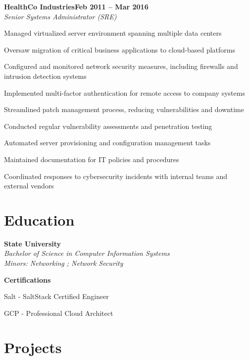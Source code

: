 \documentclass[letterpaper,10pt]{article}
\newcommand{\heading}[2]{
  \hspace{10pt}#1\hfill#2\\
}
\newcommand{\headingBf}[2]{
  \heading{\textbf{#1}}{\textbf{#2}}
}
\newcommand{\headingIt}[2]{
  \heading{\textit{#1}}{\textit{#2}}
}
\newenvironment{resume_list}{
  \vspace{-5pt}
  \begin{itemize}[itemsep=0px, parsep=2pt, leftmargin=30pt]
}{
  \end{itemize}
  \vspace{-2pt}
}
\begin{document}
  \headingBf{HealthCo Industries}{Feb 2011 -- Mar 2016}
  \headingIt{Senior Systems Administrator (SRE)}{}
  \begin{resume_list}
    \item Managed virtualized server environment spanning multiple data centers
    \item Oversaw migration of critical business applications to cloud-based platforms
    \item Configured and monitored network security measures, including firewalls and intrusion detection systems
    \item Implemented multi-factor authentication for remote access to company systems
    \item Streamlined patch management process, reducing vulnerabilities and downtime
    \item Conducted regular vulnerability assessments and penetration testing
    \item Automated server provisioning and configuration management tasks
    \item Maintained documentation for IT policies and procedures
    \item Coordinated responses to cybersecurity incidents with internal teams and external vendors
  \end{resume_list}


  \section{Education}

  \headingBf{State University}{} %
  \headingIt{Bachelor of Science in Computer Information Systems}{}
  \headingIt{Minors: Networking ; Network Security}{}

  \vspace{5pt}
  \headingBf{Certifications}{}
  \begin{resume_list}
    \item Salt \hspace{2pt}- SaltStack Certified Engineer
    \item GCP - Professional Cloud Architect
  \end{resume_list}


  \section{Projects}
\end{document}
